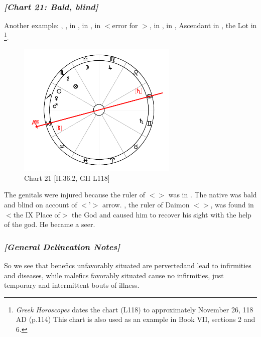 \subsubsection{\textit{[Chart 21: Bald, blind]}}
Another example: \Sun, \Venus, \Mars\xspace in \Sagittarius, \Moon\xspace in \Libra, \Saturn\xspace in \Cancer $<$error for
\Gemini$>$, \Jupiter\xspace in \Virgo, \Mercury\xspace in \Scorpio, Ascendant in \Capricorn, the Lot in \Scorpio
\footnote{\textit{Greek Horoscopes} dates the chart (L118) to approximately November 26, 118 AD (p.114) This chart is also used as an example in Book VII, sections 2 and 6.}.

\clearpage
\begin{figure}
\centering
\vspace{-20pt}
\includegraphics[width=0.68\textwidth]{charts/2_36_2}
\caption{Chart 21 [II.36.2, GH L118]}
\label{fig:chart21}
\end{figure}

The genitals were injured because the ruler of \Scorpio\xspace $<$\Mars$>$ was in \Sagittarius. The native was bald and blind on account of $<$\Sagittarius’$>$ arrow. \Jupiter, the ruler of Daimon $<$\Pisces$>$, was found in $<$the IX Place of$>$
the God and caused him to recover his sight with the help of the god. He became a seer.

\subsubsection{\textit{[General Delineation Notes]}}
So we see that benefics unfavorably situated are perverted\mnbm and lead to infirmities and diseases, while malefics favorably situated cause no infirmities, just temporary and intermittent bouts of illness. 

